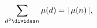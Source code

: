 \[\sum_{d^{2}\divides n}\mathop{\mu\/}\nolimits\!\left(d\right)=|\mathop{\mu\/}%
\nolimits\!\left(n\right)|,\]